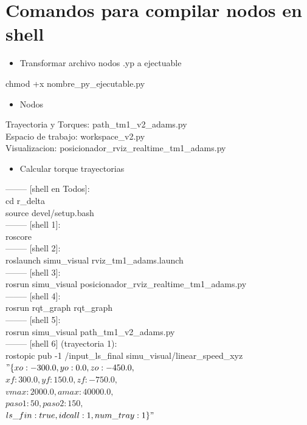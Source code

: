     \section{Comandos para compilar nodos en shell}
    
    \begin{itemize}
        \item Transformar archivo nodos .yp a ejectuable
    \end{itemize}
chmod +x nombre\_py\_ejecutable.py\\
    \begin{itemize}
        \item Nodos
    \end{itemize}
Trayectoria y Torques: path\_tm1\_v2\_adams.py\\
Espacio de trabajo: workspace\_v2.py\\
Visualizacion: posicionador\_rviz\_realtime\_tm1\_adams.py\\
    \begin{itemize}
        \item Calcular torque trayectorias
    \end{itemize}
-------- [shell en Todos]: \\
cd r\_delta\\
source devel/setup.bash\\
-------- [shell 1]: \\
roscore\\
-------- [shell 2]: \\
roslaunch simu\_visual rviz\_tm1\_adams.launch\\
-------- [shell 3]:\\
rosrun simu\_visual posicionador\_rviz\_realtime\_tm1\_adams.py\\
-------- [shell 4]:\\
rosrun rqt\_graph rqt\_graph\\
-------- [shell 5]: \\
rosrun simu\_visual path\_tm1\_v2\_adams.py\\
-------- [shell 6] (trayectoria 1):\\
rostopic pub -1 /input\_ls\_final simu\_visual/linear\_speed\_xyz\\
$"\{xo: -300.0, yo: 0.0, zo: -450.0,$\\
$xf: 300.0, yf: 150.0, zf: -750.0,$\\
$vmax: 2000.0, amax: 40000.0,$\\
$paso1: 50,  paso2: 150,$\\
$ls\_fin: true, idcall: 1, num\_tray: 1\}"$\\
